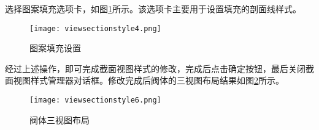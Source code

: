 选择图案填充选项卡，如图\ref{fig:viewsectionstyle4}所示。该选项卡主要用于设置填充的剖面线样式。
\clearpage
\begin{figure}[htbp]
\centering
\texttt{[image: viewsectionstyle4.png]}
\caption{图案填充设置}\label{fig:viewsectionstyle4}
\end{figure}

经过上述操作，即可完成截面视图样式的修改，完成后点击确定按钮，最后关闭截面视图样式管理器对话框。修改完成后阀体的三视图布局结果如图\ref{fig:viewsectionstyle6}所示。
\begin{figure}[htbp]
\centering
\texttt{[image: viewsectionstyle6.png]}
\caption{阀体三视图布局}\label{fig:viewsectionstyle6}
\end{figure}
\endinput

